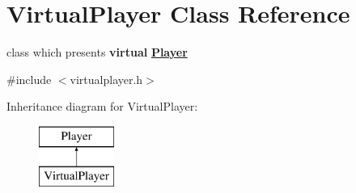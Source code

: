 \hypertarget{class_virtual_player}{}\section{Virtual\+Player Class Reference}
\label{class_virtual_player}


class which presents {\bfseries{virtual}} {\bfseries{\mbox{\hyperlink{class_player}{Player}}}}  




{\ttfamily \#include $<$virtualplayer.\+h$>$}

Inheritance diagram for Virtual\+Player\+:\begin{figure}[H]
\begin{center}
\leavevmode
\includegraphics[height=2.000000cm]{d5/d9f/class_virtual_player}
\end{center}
\end{figure}
